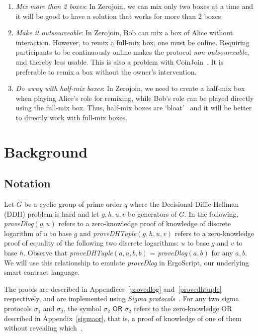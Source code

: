 \documentclass[runningheads]{llncs}
\newcommand{\zerojoin}{Zerojoin\xspace}
\begin{document}
\begin{enumerate}
    \item {\em Mix more than 2 boxes}: In \zerojoin, we can mix only two boxes at a time and it will be good to have a solution that works for more than 2 boxes
    \item {\em Make it outsourceable}: In \zerojoin, Bob can mix a box of Alice without interaction. However, to remix a full-mix box, one must be online. Requiring participants to be continuously online makes the protocol {\em non-outsourceable}, and thereby less usable. This is also a problem with CoinJoin~\cite{coinjoin}. It is preferable to remix a box without the owner's intervention.
    \item {\em Do away with half-mix boxes}: In \zerojoin, we need to create a half-mix box when playing Alice's role for remixing, while Bob's role can be played directly using the full-mix box. Thus, half-mix boxes are `bloat'~\cite{zerojoin} and it will be better to directly work with full-mix boxes.
\end{enumerate}

\section{Background}
\subsection{Notation}

Let $G$ be a cyclic group of prime order $q$ where the Decisional-Diffie-Hellman (DDH) problem is hard and let $g, h, u, v$ be generators of $G$.
In the following, {\em proveDlog$(g, u)$} refers to a zero-knowledge proof of knowledge of discrete logarithm of $u$ to base $g$ and
{\em proveDHTuple$(g, h, u, v)$} refers to a zero-knowledge proof of equality of the following two discrete logarithms: $u$ to base $g$ and $v$ to base $h$.
Observe that {\em proveDHTuple$(a, a, b, b)$} = {\em proveDlog$(a, b)$} for any $a, b$. We will use this relationship to emulate {\em proveDlog}
in ErgoScript, our underlying smart contract language.

The proofs are described in Appendices~\ref{provedlog} and~\ref{provedhtuple} respectively, and are implemented using {\em Sigma protocols}~\cite{zerojoin,CDS94}.
For any two sigma protocols $\sigma_1$ and $\sigma_2$, the symbol $\sigma_2 \textsf{ OR } \sigma_2$ refers to the zero-knowledge OR described in Appendix~\ref{sigmaor}, that is, a proof of knowledge of one of them without revealing which~\cite{CDS94}.
\end{document}
